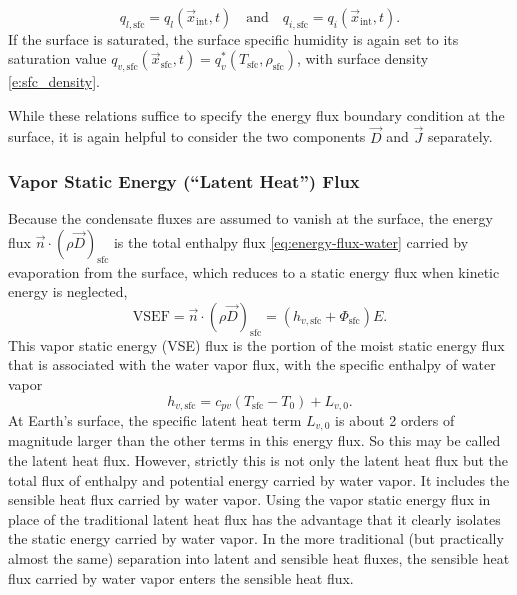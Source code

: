 \documentclass{report}
\begin{document}
\begin{enumerate}
    \[
    q_{l, \mathrm{sfc}} = q_l(\vec{x}_\mathrm{int}, t) \quad \text{and} \quad q_{i, \mathrm{sfc}} = q_i(\vec{x}_\mathrm{int}, t).
    \]
    If the surface is saturated, the surface specific humidity is again set to its saturation value $q_{v, \mathrm{sfc}}(\vec{x}_\mathrm{sfc}, t) =q_v^*(T_\mathrm{sfc}, \rho_\mathrm{sfc})$, with surface density \eqref{e:sfc_density}.
\end{enumerate}
While these relations suffice to specify the energy flux boundary condition at the surface, it is again helpful to consider the two components $\vec{D}$ and $\vec{J}$ separately. 

\subsubsection{Vapor Static Energy (``Latent Heat'') Flux}

Because the condensate fluxes are assumed to vanish at the surface, the energy flux $\vec{n} \cdot (\rho \vec{D})_{\mathrm{sfc}}$ is the total enthalpy flux \eqref{eq:energy-flux-water} carried by evaporation from the surface, which reduces to a static energy flux when kinetic energy is neglected,
\begin{equation}\label{e:sfc_LHF}
     \mathrm{VSEF} = \vec{n} \cdot (\rho \vec{D})_{\mathrm{sfc}}   = (h_{v, \mathrm{sfc}} + \Phi_\mathrm{sfc}) E.
\end{equation}
This vapor static energy (VSE) flux is the portion of the moist static energy flux that is associated with the water vapor flux, with the specific enthalpy of water vapor
\[
h_{v, \mathrm{sfc}} = c_{pv} (T_\mathrm{sfc}-T_0) + L_{v,0}.
\]
At Earth's surface, the specific latent heat term $L_{v,0}$ is about 2 orders of magnitude larger than the other terms in this energy flux. So this may be called the latent heat flux. However, strictly this is not only the latent heat flux but the total flux of enthalpy and potential energy carried by water vapor. It includes the sensible heat flux carried by water vapor. Using the vapor static energy flux in place of the traditional latent heat flux has the advantage that it clearly isolates the static energy carried by water vapor. In the more traditional (but practically almost the same) separation into latent and sensible heat fluxes, the sensible heat flux carried by water vapor enters the sensible heat flux.
\end{document}
